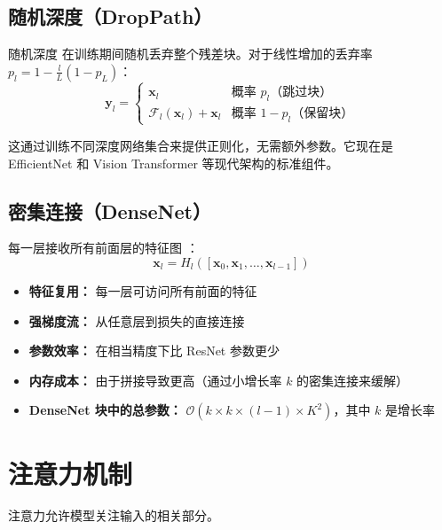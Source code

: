 \subsection{随机深度（DropPath）}

随机深度 \cite{huang2016deep} 在训练期间随机丢弃整个残差块。对于线性增加的丢弃率 $p_l = 1 - \frac{l}{L}(1 - p_L)$：
\begin{equation}
\mathbf{y}_l = \begin{cases} \mathbf{x}_l & \text{概率 } p_l \text{（跳过块）} \\ \mathcal{F}_l(\mathbf{x}_l) + \mathbf{x}_l & \text{概率 } 1 - p_l \text{（保留块）} \end{cases}
\end{equation}

这通过训练不同深度网络集合来提供正则化，无需额外参数。它现在是 EfficientNet 和 Vision Transformer 等现代架构的标准组件。

\subsection{密集连接（DenseNet）}

每一层接收所有前面层的特征图 \cite{huang2017densely}：
\begin{equation}
\mathbf{x}_l = H_l([\mathbf{x}_0, \mathbf{x}_1, \ldots, \mathbf{x}_{l-1}])
\end{equation}

\begin{properties}
\begin{itemize}
    \item \textbf{特征复用：} 每一层可访问所有前面的特征
    \item \textbf{强梯度流：} 从任意层到损失的直接连接
    \item \textbf{参数效率：} 在相当精度下比 ResNet 参数更少
    \item \textbf{内存成本：} 由于拼接导致更高（通过小增长率 $k$ 的密集连接来缓解）
    \item \textbf{DenseNet 块中的总参数：} $\mathcal{O}(k \times k \times (l-1) \times K^2)$，其中 $k$ 是增长率
\end{itemize}
\end{properties}

\section{注意力机制}

注意力允许模型关注输入的相关部分。

